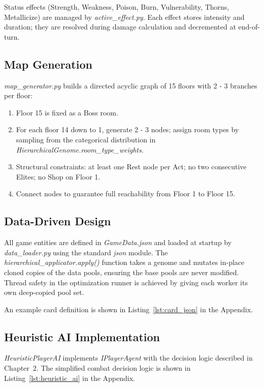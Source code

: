 Status effects (Strength, Weakness, Poison, Burn, Vulnerability, Thorns, Metallicize) are managed by \textit{active\_effect.py}. Each effect stores intensity and duration; they are resolved during damage calculation and decremented at end-of-turn.

\subsection{Map Generation}

\textit{map\_generator.py} builds a directed acyclic graph of 15 floors with 2 - 3 branches per floor:

\begin{enumerate}
    \item Floor 15 is fixed as a Boss room.
    \item For each floor 14 down to 1, generate 2 - 3 nodes; assign room types by sampling from the categorical distribution in \textit{HierarchicalGenome.room\_type\_weights}.
    \item Structural constraints: at least one Rest node per Act; no two consecutive Elites; no Shop on Floor 1.
    \item Connect nodes to guarantee full reachability from Floor 1 to Floor 15.
\end{enumerate}

\subsection{Data-Driven Design}

All game entities are defined in \textit{GameData.json} and loaded at startup by \textit{data\_loader.py} using the standard \textit{json} module. The \textit{hierarchical\_applicator.apply()} function takes a genome and mutates in-place cloned copies of the data pools, ensuring the base pools are never modified. Thread safety in the optimization runner is achieved by giving each worker its own deep-copied pool set.

An example card definition is shown in Listing~\ref{lst:card_json} in the Appendix.

\subsection{Heuristic AI Implementation}

\textit{HeuristicPlayerAI} implements \textit{IPlayerAgent} with the decision logic described in Chapter~2. The simplified combat decision logic is shown in Listing~\ref{lst:heuristic_ai} in the Appendix.

